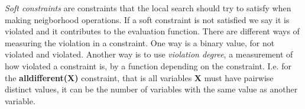 \emph{Soft constraints} are constraints that the local search should try to satisfy when making neigborhood operations. 
If a soft constraint is not satisfied we say it is violated and it contributes to the evaluation function. There are 
different ways of measuring the violation in a constraint. One way is a binary value, for not violated and violated. 
Another way is to use \emph{violation degree}, a measurement of how violated a constraint is, by a 
function depending on the constraint. I.e. for the \textbf{alldifferent(X)} constraint, that is all variables \textbf{X} 
must have pairwise distinct values, it can be the number of variables with the same value as another variable. \\ 

